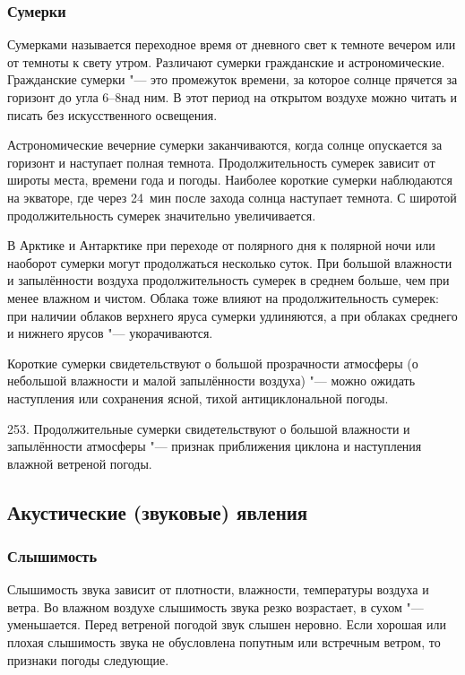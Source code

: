 \subsubsection{Сумерки}

Сумерками называется переходное время от дневного свет к темноте
вечером или от темноты к свету утром. Различают сумерки гражданские и
астрономические. Гражданские сумерки "--- это промежуток времени, за
которое солнце прячется за горизонт до угла 6--8\gr над ним. В этот
период на открытом воздухе можно читать и писать без искусственного
освещения.

Астрономические вечерние сумерки заканчиваются, когда солнце
опускается за горизонт и наступает полная темнота. Продолжительность
сумерек зависит от широты места, времени года и погоды. Наиболее
короткие сумерки наблюдаются на экваторе, где через 24~мин после
захода солнца наступает темнота. С широтой продолжительность сумерек
значительно увеличивается.

В Арктике и Антарктике при переходе от полярного дня к полярной ночи
или наоборот сумерки могут продолжаться несколько суток. При большой
влажности и запылённости воздуха продолжительность сумерек в среднем
больше, чем при менее влажном и чистом. Облака тоже влияют на
продолжительность сумерек: при наличии облаков верхнего яруса сумерки
удлиняются, а при облаках среднего и нижнего ярусов "--- укорачиваются.

 Короткие сумерки свидетельствуют о большой прозрачности
атмосферы (о небольшой влажности и малой запылённости воздуха) "--- можно
ожидать наступления или сохранения ясной, тихой антициклональной
погоды.

253. Продолжительные сумерки свидетельствуют о большой влажности и
запылённости атмосферы "--- признак приближения циклона и наступления
влажной ветреной погоды.

\subsection{Акустические (звуковые) явления}

\subsubsection{Слышимость}

Слышимость звука зависит от плотности, влажности, температуры воздуха
и ветра. Во влажном воздухе слышимость звука резко возрастает, в сухом
"--- уменьшается. Перед ветреной погодой звук слышен неровно. Если
хорошая или плохая слышимость звука не обусловлена попутным или
встречным ветром, то признаки погоды следующие.

